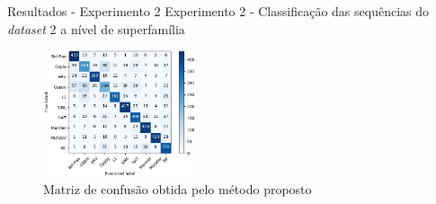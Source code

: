 \documentclass[%
  xcolor=table,%
  10pt,%
  aspectratio = 169,%
  compress,%
  t,%
]{beamer}%
\begin{document}
\begin{frame}{}{Resultados - Experimento 2}
    Experimento 2 - Classificação das sequências do \textit{dataset} 2 a nível de superfamília
    \begin{figure}[H]
        \centering
        \includegraphics[width=0.4\textwidth]{./Figuras/mc-sf-teste7.png}
        \caption{Matriz de confusão obtida pelo método proposto}
        \label{fig:mc-sf-teste2}
    \end{figure}       
\end{frame}
\end{document}
